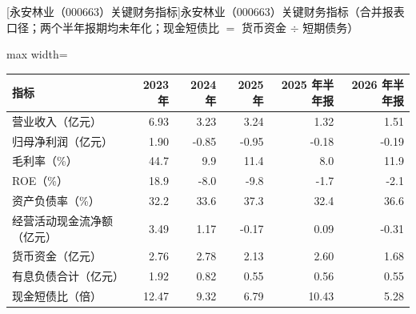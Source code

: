 \begin{center}\small\setlength{\tabcolsep}{3.4pt}
[永安林业（000663）关键财务指标]{永安林业（000663）关键财务指标（合并报表口径；两个半年报期均未年化；现金短债比 $=$ 货币资金 $\div$ 短期债务）}
\begin{adjustbox}{max width=\textwidth}
\begin{tabular}{@{}lrrrrr@{}}
\toprule
指标 & 2023 年 & 2024 年 & 2025 年 & 2025 年半年报 & 2026 年半年报 \\
\midrule
营业收入（亿元） & 6.93 & 3.23 & 3.24 & 1.32 & 1.51 \\
归母净利润（亿元） & 1.90 & -0.85 & -0.95 & -0.18 & -0.19 \\
毛利率（\%） & 44.7 & 9.9 & 11.4 & 8.0 & 11.9 \\
ROE（\%） & 18.9 & -8.0 & -9.8 & -1.7 & -2.1 \\
资产负债率（\%） & 32.2 & 33.6 & 37.3 & 32.4 & 36.6 \\
经营活动现金流净额（亿元） & 3.49 & 1.17 & -0.17 & 0.09 & -0.31 \\
货币资金（亿元） & 2.76 & 2.78 & 2.13 & 2.60 & 1.68 \\
有息负债合计（亿元） & 1.92 & 0.82 & 0.55 & 0.56 & 0.55 \\
现金短债比（倍） & 12.47 & 9.32 & 6.79 & 10.43 & 5.28 \\
\bottomrule
\end{tabular}
\end{adjustbox}
\end{center}

